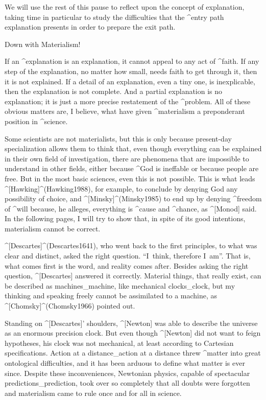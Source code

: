 We will use the rest of this pause to reflect upon the concept of
explanation, taking time in particular to study the difficulties that
the ^{entry path explanation} presents in order to prepare the exit
path.


\Section Down with Materialism!

If an ^{explanation} is an explanation, it cannot appeal to any act of
^{faith}. If any step of the explanation, no matter how small, needs
faith to get through it, then it is not explained. If a detail of an
explanation, even a tiny one, is inexplicable, then the explanation is
not complete. And a partial explanation is no explanation; it is just a
more precise restatement of the ^{problem}. All of these obvious matters
are, I believe, what have given ^{materialism} a preponderant position
in ^{science}.

Some scientists are not materialists, but this is only because
present-day specialization allows them to think that, even though
everything can be explained in their own field of investigation, there
are phenomena that are impossible to understand in other fields, either
because ^{God} is ineffable or because people are free. But in the most
basic sciences, even this is not possible. This is what leads
^[Hawking]^(Hawking1988), for example, to conclude by denying God any
possibility of choice, and ^[Minsky]^(Minsky1985) to end up by denying
^{freedom} of ^{will} because, he alleges, everything is ^{cause} and
^{chance}, as ^[Monod] said. In the following pages, I will try to show
that, in spite of its good intentions, materialism cannot be correct.

^[Descartes]^(Descartes1641), who went back to the first principles, to
what was clear and distinct, asked the right question. ``I~think,
therefore I~am''.  That is, what comes first is the word, and reality
comes after. Besides asking the right question, ^[Descartes] answered it
correctly. Material things, that really exist, can be described as
machines_{machine}, like mechanical clocks_{clock}, but my thinking and
speaking freely cannot be assimilated to a machine, as
^[Chomsky]^(Chomsky1966) pointed out.

Standing on ^[Descartes]' shoulders, ^[Newton] was able to describe the
universe as an enormous precision clock. But even though ^[Newton] did
not want to feign hypotheses, his clock was not mechanical, at least
according to Cartesian specifications. Action at a distance_{action at a
distance} threw ^{matter} into great ontological difficulties, and it
has been arduous to define what matter is ever since. Despite these
inconveniences, Newtonian physics, capable of spectacular
predictions_{prediction}, took over so completely that all doubts were
forgotten and materialism came to rule once and for all in science.

